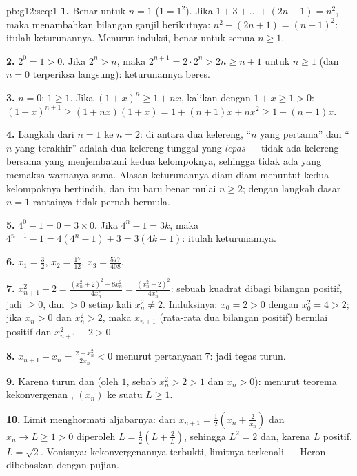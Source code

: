 \begin{solution}{pb:g12:seq:1}
\textbf{1.} Benar untuk $n = 1$ ($1 = 1^2$). Jika
$1 + 3 + \dots + (2n - 1) = n^2$, maka menambahkan bilangan ganjil
berikutnya: $n^2 + (2n + 1) = (n + 1)^2$: itulah keturunannya. Menurut
induksi, benar untuk semua $n \geq 1$.

\textbf{2.} $2^0 = 1 > 0$. Jika $2^n > n$, maka
$2^{n+1} = 2 \cdot 2^n > 2n \geq n + 1$ untuk $n \geq 1$ (dan
$n = 0$ terperiksa langsung): keturunannya beres.

\textbf{3.} $n = 0$: $1 \geq 1$. Jika
$(1 + x)^n \geq 1 + nx$, kalikan dengan $1 + x \geq 1 > 0$:
$(1 + x)^{n+1} \geq (1 + nx)(1 + x) = 1 + (n + 1)x + nx^2
\geq 1 + (n + 1)x$.

\textbf{4.} Langkah dari $n = 1$ ke $n = 2$: di antara dua
kelereng, ``$n$ yang pertama'' dan ``$n$ yang terakhir'' adalah dua
kelereng tunggal yang \emph{lepas} --- tidak ada kelereng bersama yang
menjembatani kedua kelompoknya, sehingga tidak ada yang memaksa warnanya
sama. Alasan keturunannya diam-diam menuntut kedua kelompoknya bertindih,
dan itu baru benar mulai $n \geq 2$; dengan langkah dasar $n = 1$ rantainya
tidak pernah bermula.

\textbf{5.} $4^0 - 1 = 0 = 3 \times 0$. Jika $4^n - 1 = 3k$,
maka $4^{n+1} - 1 = 4(4^n - 1) + 3 = 3(4k + 1)$: itulah keturunannya.

\textbf{6.} $x_1 = \frac32$, $x_2 = \frac{17}{12}$,
$x_3 = \frac{577}{408}$.

\textbf{7.} $x_{n+1}^2 - 2 = \frac{(x_n^2 + 2)^2 - 8x_n^2}
{4x_n^2} = \frac{(x_n^2 - 2)^2}{4 x_n^2}$: sebuah kuadrat dibagi
bilangan positif, jadi $\geq 0$, dan $> 0$ setiap kali $x_n^2 \neq 2$.
Induksinya: $x_0 = 2 > 0$ dengan $x_0^2 = 4 > 2$; jika $x_n > 0$
dan $x_n^2 > 2$, maka $x_{n+1}$ (rata-rata dua bilangan positif) bernilai
positif dan $x_{n+1}^2 - 2 > 0$.

\textbf{8.} $x_{n+1} - x_n = \frac{2 - x_n^2}{2x_n} < 0$ menurut
pertanyaan 7: jadi tegas turun.

\textbf{9.} Karena turun dan  (oleh $1$, sebab
$x_n^2 > 2 > 1$ dan $x_n > 0$): menurut teorema kekonvergenan
, $(x_n)$  ke suatu $L \geq 1$.

\textbf{10.} Limit menghormati aljabarnya: dari
$x_{n+1} = \frac12\left(x_n + \frac{2}{x_n}\right)$ dan
$x_n \to L \geq 1 > 0$ diperoleh
$L = \frac12\left(L + \frac2L\right)$, sehingga $L^2 = 2$ dan, karena $L$
positif, $L = \sqrt2$. Vonisnya: kekonvergenannya terbukti,
limitnya terkenali --- Heron dibebaskan dengan pujian.


\end{solution}
